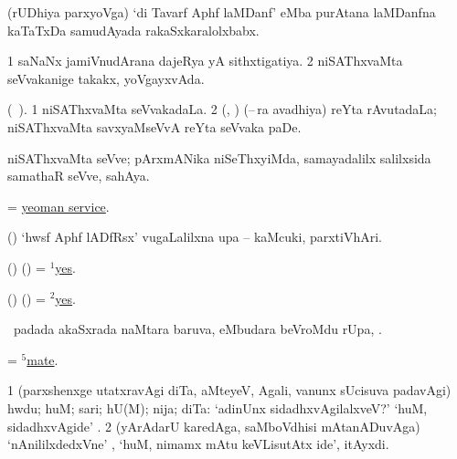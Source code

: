  (rUDhiya parxyoVga) `di  Tavarf Aphf laMDanf' eMba purAtana laMDanfna kaTaTxDa samudAyada rakaSxkaralolxbabx.
\eanum
\numie
\enum
\emng
\eentry

\bentry
{} 
\gl{\gu} 
\bmng
\bnum
\num{1} saNaNx jamiVnudArana dajeRya yA sithxtigatiya. 
\num{2} niSAThxvaMta seVvakanige takakx, yoVgayxvAda.
\enum
\emng 
\eentry

\bentry
{} 
\gl{\nA} 
\bmng
(\bava\ ).
\bnum
\num{1} niSAThxvaMta seVvakadaLa. 
\num{2} (\birx, \ca) (--\,ra avadhiya) reYta rAvutadaLa; niSAThxvaMta  savxyaMseVvA reYta seVvaka paDe.
\enum
\emng
\eentry

\bentry
{}
\gl{\nA} 
\bmng
niSAThxvaMta seVve; pArxmANika niSeThxyiMda, samayadalilx salilxsida samathaR seVve, sahAya.
\emng
\eentry

\bentry
{}
\gl{\nA} 
\bmng
= \hyperlink{yeoman service}{yeoman service}.
\emng
\eentry

\bentry
{}
\gl{\nA} 
\bmng
(\birx) `hwsf Aphf lADfRsx'  \mo vugaLalilxna upa -- kaMcuki, parxtiVhAri.
\emng
\eentry

\bentry
{} 
\gl{\kirxvi} 
\bmng
(\ame) (\AmA) = \hyperlink{yes(1)}{$^1$yes}.
\emng
\eentry

\bentry
{} 
\gl{\nA} 
\bmng
(\ame) (\AmA) = \hyperlink{yes(2)}{$^2$yes}.
\emng
\eentry

\bentry
{} 
\gl{\uparx} 
\bmng
\sA\ padada  akaSxrada naMtara baruva,  eMbudara beVroMdu rUpa, \udA. 
\emng
\eentry

\bentry
{}
\gl{\nA} 
\bmng
= \hyperref{kandict_m.pdf}{M}{mate(5)}{$^5$mate}.
\emng 
\eentry

\bentry
{} 
\gl{\kirxvi} 
\bmng
\bnum
\num{1}  (parxshenxge utatxravAgi diTa, aMteyeV, Agali, \mo vanunx sUcisuva padavAgi) hwdu; huM; sari; hU(M); nija; diTa:  `adinUnx sidadhxvAgilalxveV?' `huM, sidadhxvAgide' . 
\num{2} (yArAdarU karedAga, saMboVdhisi mAtanADuvAga) `nAnililxdedxVne' , `huM, nimamx mAtu keVLisutAtx ide', itAyxdi.   
\enum
\emng

